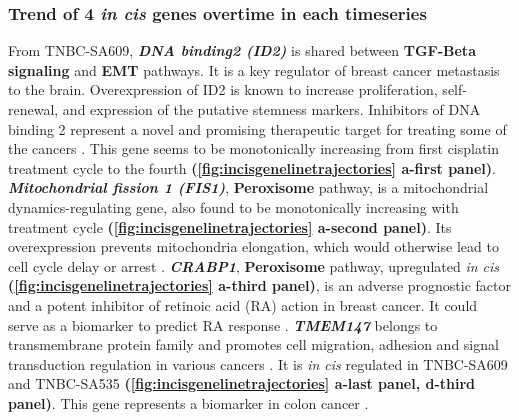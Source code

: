  \subsubsection{Trend of 4 \textit{in cis} genes overtime in each timeseries}
 From TNBC-SA609, \textit{\textbf{DNA binding2 (ID2)}} is shared between \textbf{TGF-Beta signaling} and \textbf{EMT} pathways. It is a key regulator of breast cancer metastasis to the brain. Overexpression of ID2 is known to increase proliferation, self-renewal, and expression of the putative stemness markers.  Inhibitors of DNA binding 2 represent a novel and promising therapeutic target for treating some of the cancers \cite{bae2017inhibitor, kijewska2019using}. This gene seems to be monotonically increasing from first cisplatin treatment cycle to the fourth \textbf{(\autoref{fig:incisgenelinetrajectories} a-first panel)}. \textit{\textbf{Mitochondrial fission 1 (FIS1)}}, \textbf{Peroxisome} pathway, is a mitochondrial dynamics-regulating gene, also found to be monotonically increasing with treatment cycle \textbf{(\autoref{fig:incisgenelinetrajectories} a-second panel)}. Its overexpression prevents mitochondria elongation, which would otherwise lead to cell cycle delay or arrest \cite{fan2015mir, anderson2018dysregulation}. \textit{\textbf{CRABP1}}, \textbf{Peroxisome} pathway, upregulated \textit{in cis} \textbf{(\autoref{fig:incisgenelinetrajectories} a-third panel)}, is an adverse prognostic factor and a potent inhibitor of retinoic acid (RA) action in breast cancer. It could serve as a biomarker to predict RA response \cite{liu2015crabp1}. \textit{\textbf{TMEM147}} belongs to transmembrane protein family and promotes cell migration, adhesion and signal transduction regulation in various cancers \cite{yu2011knockdown}. It is \textit{in cis} regulated in TNBC-SA609 and TNBC-SA535 \textbf{(\autoref{fig:incisgenelinetrajectories} a-last panel, d-third panel)}. This gene represents a biomarker in colon cancer \cite{feng2019identification}. 
 

